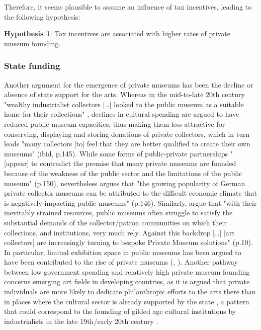 \documentclass[11pt]{article}
\begin{document}
Therefore, it seems plausible to assume an influence of tax incentives, leading to the following hypothesis:

\bigbreak
\noindent
\textbf{Hypothesis 1}: Tax incentives are associated with higher rates of private museum founding.




\subsubsection*{State funding}






Another argument for the emergence of private museums has been the decline or absence of state support for the arts. 
Whereas in the mid-to-late 20th century "wealthy industrialist collectors [\ldots{}] looked to the public museum as a suitable home for their collections" \parencite[p.144]{Walker_2019_collector}, declines in cultural spending are argued to have reduced public museum capacities, thus making them less attractive for conserving, displaying and storing donations of private collectors, which in turn leads "many collectors [to] feel that they are better qualified to create their own museums" (ibid, p.145).
While some forms of public-private partnerships "[appear] to contradict the premise that many private museums are founded because of the weakness of the public sector and the limitations of the public museum" (p.150),  \textcite{Walker_2019_collector} nevertheless argues that "the growing popularity of German private collector museums can be attributed to the difficult economic climate that is negatively impacting public museums" (p.146). 
Similarly, \textcite{Boloten_Hacking_2021_foreword} argue that "with their inevitably strained resources, public museums often struggle to satisfy the substantial demands of the collector/patron communities on which their collections, and institutions, very much rely. Against this backdrop [\ldots{}] [art collectors] are increasingly turning to bespoke Private Museum solutions" (p.10). 
In particular, limited exhibition space in public museums has been argued to have been contributed to the rise of private museums (\cite[p.217]{Walker_2019_collector}, \cite[p.1]{Zorloni_Resch_2016_opportunities}). 
Another pathway between low government spending and relatively high private museum founding concerns emerging art fields in developing countries, as it is argued that private individuals are more likely to dedicate philanthropic efforts to the arts there than in places where the cultural sector is already supported by the state \parencite{Durand_2018_jumex,Bechtler_Imhof_2018_future,Boloten_Hacking_2021_foreword}, a pattern that could correspond to the founding of gilded age cultural institutions by industrialists in the late 19th/early 20th century \parencite{diMaggio_1982_boston,Adam_2004_philanthropy}. 
\end{document}
